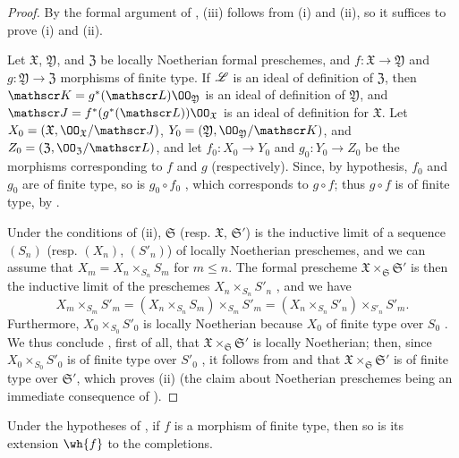 \begin{proof}
\label{proof-1.10.13.5}
By the formal argument of , (iii) follows from (i) and (ii), so it suffices to prove (i) and (ii).

Let $\mathfrak{X}$, $\mathfrak{Y}$, and $\mathfrak{Z}$ be locally Noetherian formal preschemes, and $f:\mathfrak{X}\to\mathfrak{Y}$ and $g:\mathfrak{Y}\to\mathfrak{Z}$ morphisms of finite type.
If $\mathscr{L}$ is an ideal of definition of $\mathfrak{Z}$, then $\sh{K}=g^*(\sh{L})\OO_\mathfrak{Y}$ is an ideal of definition of $\mathfrak{Y}$, and $\sh{J}=f^*(g^*(\sh{L}))\OO_\mathfrak{X}$ is an ideal of definition for $\mathfrak{X}$.
Let $X_0=(\mathfrak{X},\OO_\mathfrak{X}/\sh{J})$, $Y_0=(\mathfrak{Y},\OO_\mathfrak{Y}/\sh{K})$, and $Z_0=(\mathfrak{Z},\OO_\mathfrak{Z}/\sh{L})$, and let $f_0:X_0\to Y_0$ and $g_0:Y_0\to Z_0$ be the morphisms corresponding to $f$ and $g$ (respectively).
Since, by hypothesis, $f_0$ and $g_0$ are of finite type, so is $g_0\circ f_0$ , which corresponds to $g\circ f$;
thus $g\circ f$ is of finite type, by .

Under the conditions of (ii), $\mathfrak{S}$ (resp. $\mathfrak{X}$, $\mathfrak{S}'$) is the inductive limit of a sequence $(S_n)$ (resp. $(X_n)$, $(S'_n)$) of locally Noetherian preschemes, and we can assume  that $X_m=X_n\times_{S_n}S_m$ for $m\leq n$.
The formal prescheme $\mathfrak{X}\times_\mathfrak{S}\mathfrak{S}'$ is then the inductive limit of the preschemes $X_n\times_{S_n}S'_n$ , and we have
\[
    X_m\times_{S_m}S'_m = (X_n\times_{S_n}S_m)\times_{S_m}S'_m = (X_n\times_{S_n}S'_n)\times_{S'_n}S'_m.
\]
Furthermore, $X_0\times_{S_0}S'_0$ is locally Noetherian because $X_0$ of finite type over $S_0$ .
We thus conclude , first of all, that $\mathfrak{X}\times_\mathfrak{S}\mathfrak{S}'$ is locally Noetherian;
then, since $X_0\times_{S_0}S'_0$ is of finite type over $S'_0$ , it follows from  and  that $\mathfrak{X}\times_\mathfrak{S}\mathfrak{S}'$ is of finite type over $\mathfrak{S}'$, which proves (ii) (the claim about Noetherian preschemes being an immediate consequence of ).
\end{proof}

\begin{cor}[10.13.6]
\label{1.10.13.6}
Under the hypotheses of , if $f$ is a morphism of finite type, then so is its extension $\wh{f}$ to the completions.
\end{cor}

